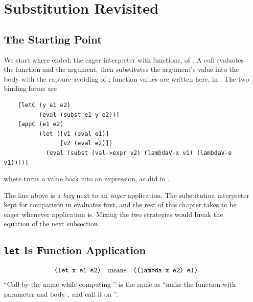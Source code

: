 \section{Substitution Revisited}
\label{sec:substrev}

\subsection{The Starting Point}

We start where  ended: the eager interpreter with functions,  of . A call evaluates the function and the argument, then substitutes the argument's value into the body with the capture-avoiding  of ; function values are written  here,  in . The two binding forms are
\begin{lstlisting}
    [letC (y e1 e2)
          (eval (subst e1 y e2))]
    [appC (e1 e2)
          (let ([v1 (eval e1)]
                [v2 (eval e2)])
            (eval (subst (val->expr v2) (lambdaV-x v1) (lambdaV-e v1))))]
\end{lstlisting}
where  turns a value back into an expression, as  did in .

\begin{remark}
The  line above is a \emph{lazy}  next to an \emph{eager} application. The substitution interpreter kept for comparison in  evaluates  first, and the rest of this chapter takes  to be eager whenever application is. Mixing the two strategies would break the equation of the next subsection.
\end{remark}

\subsection{\texttt{let} Is Function Application}

\begin{keypoint}
\[
\texttt{(let x e1 e2)} \quad\text{means}\quad \texttt{((lambda x e2) e1)}.
\]
``Call  by the name  while computing '' is the same as ``make the function with parameter  and body , and call it on ''.
\end{keypoint}

